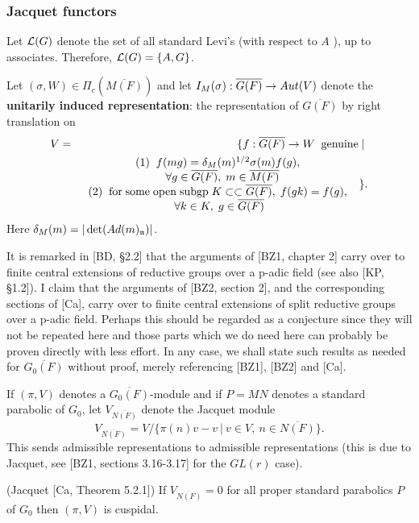 \subsubsection{Jacquet functors}

Let ${\cal L}(G)$ denote the set of all standard Levi's (with respect to $A$%
), up to associates. Therefore, ${\cal L}(G)=\{A,G\}$.

Let $(\sigma ,W)\in \Pi _c(\overline{M(F)})$ and let $I_M(\sigma ):\overline{%
G(F)}\rightarrow Aut(V)$ denote the {\bf unitarily induced representation}:
the representation of $\overline{G(F)}$ by right translation on 
\begin{eqnarray*}
V &=&\{f:\overline{G(F)}\rightarrow W\;\;{\rm genuine}\;|\; \\
&& 
\begin{array}{c}
(1)\;\;f(mg)=\delta _M(m)^{1/2}\sigma (m)f(g),\;\; \\ 
\;\forall g\in \overline{G(F)},\;m\in \overline{M(F)} \\ 
(2)\;\;{\rm for\;some\;open\;subgp}\;K\subset \subset \overline{G(F)}%
,\;f(gk)=f(g),\;\; \\ 
\forall k\in K,\;g\in \overline{G(F)}\;
\end{array}
\}.
\end{eqnarray*}
Here $\delta _M(m)=|\det (Ad(m)_{{\frak n}})|$.

It is remarked in [BD, \S 2.2] that the arguments of [BZ1, chapter 2] carry
over to finite central extensions of reductive groups over a p-adic field
(see also [KP, \S 1.2]). I claim that the arguments of [BZ2, section 2], and
the corresponding sections of [Ca], carry over to finite central extensions
of split reductive groups over a p-adic field. Perhaps this should be
regarded as a conjecture since they will not be repeated here and those
parts which we do need here can probably be proven directly with less
effort. In any case, we shall state such results as needed for
$\overline{G_0(F)}$ without proof, merely referencing [BZ1], [BZ2] and [Ca].

If $(\pi ,V)$ denotes a $\overline{G_0(F)}$-module and if $P=MN$ denotes a
standard parabolic of $G_0$, let $V_{\overline{N(F)}}$ denote the Jacquet
module 
\[
V_{\overline{N(F)}}=V/\{\pi (n)v-v\ |\ v\in V,\ n\in \overline{N(F)}\}. 
\]
This sends admissible representations to admissible representations (this is
due to Jacquet, see [BZ1, sections 3.16-3.17] for the $GL(r)$ case).

\begin{lemma}
(Jacquet [Ca, Theorem 5.2.1]) If $V_{\overline{N(F)}}=0$ for all proper
standard parabolics $P$ of $G_0$ then $(\pi ,V)$ is cuspidal.
\end{lemma}


